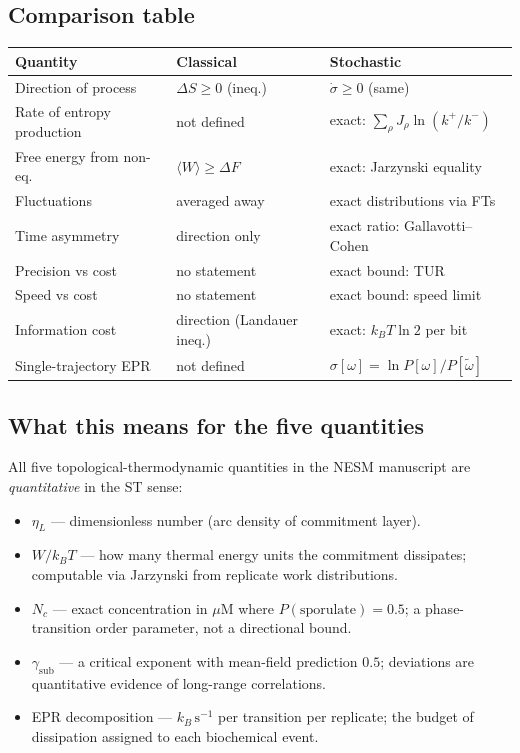 \documentclass[11pt,a4paper]{article}
\begin{document}
\subsection*{Comparison table}

\begin{center}
\small
\begin{tabular}{lll}
\toprule
\textbf{Quantity} & \textbf{Classical} & \textbf{Stochastic} \\
\midrule
Direction of process         & $\Delta S \geq 0$ (ineq.) & $\dot\sigma \geq 0$ (same) \\
Rate of entropy production   & not defined               & exact: $\sum_\rho J_\rho \ln(k^+/k^-)$ \\
Free energy from non-eq.     & $\langle W\rangle \geq \Delta F$ & exact: Jarzynski equality \\
Fluctuations                 & averaged away             & exact distributions via FTs \\
Time asymmetry               & direction only            & exact ratio: Gallavotti--Cohen \\
Precision vs cost            & no statement              & exact bound: TUR \\
Speed vs cost                & no statement              & exact bound: speed limit \\
Information cost             & direction (Landauer ineq.)& exact: $k_BT\ln 2$ per bit \\
Single-trajectory EPR        & not defined               & $\sigma[\omega] = \ln P[\omega]/P[\tilde\omega]$ \\
\bottomrule
\end{tabular}
\end{center}

\subsection*{What this means for the five quantities}

All five topological-thermodynamic quantities in the NESM manuscript are
\emph{quantitative} in the ST sense:
\begin{itemize}
  \item $\eta_L$ --- dimensionless number (arc density of commitment layer).
  \item $W/k_BT$ --- how many thermal energy units the commitment dissipates;
    computable via Jarzynski from replicate work distributions.
  \item $N_c$ --- exact concentration in $\mu$M where $P(\text{sporulate})=0.5$;
    a phase-transition order parameter, not a directional bound.
  \item $\gamma_{\mathrm{sub}}$ --- a critical exponent with mean-field
    prediction $0.5$; deviations are quantitative evidence of long-range
    correlations.
  \item EPR decomposition --- $k_B\,\mathrm{s}^{-1}$ per transition per
    replicate; the budget of dissipation assigned to each biochemical event.
\end{itemize}
\end{document}
